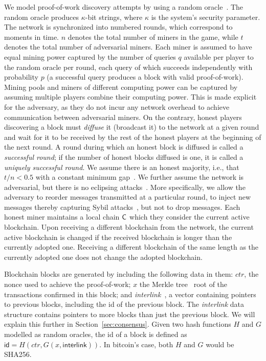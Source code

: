 We model proof-of-work discovery attempts by using a random oracle~\cite{ro}.
The random oracle produces $\kappa$-bit strings, where $\kappa$ is the system's
security parameter. The network is synchronized into numbered rounds, which
correspond to moments in time. $n$ denotes the total number of miners in the
game, while $t$ denotes the total number of adversarial miners. Each miner is
assumed to have equal mining power captured by the number of queries $q$
available per player to the random oracle per round, each query of which
succeeds independently with probability $p$ (a successful query produces a block
with valid proof-of-work). Mining pools and miners of different computing power
can be captured by assuming multiple players combine their computing power. This
is made explicit for the adversary, as they do not incur any network overhead to
achieve communication between adversarial miners. On the contrary, honest
players discovering a block must \emph{diffuse} it (broadcast it) to the
network at a given round and wait for it to be received by the rest of the
honest players at the beginning of the next round. A round during which an
honest block is diffused is called a \emph{successful round}; if the number of
honest blocks diffused is one, it is called a \emph{uniquely successful round}.
We assume there is an honest majority, i.e., that $t / n < 0.5$ with a constant
minimum gap~\cite{backbone}. We further assume the network is adversarial, but
there is no eclipsing attacks~\cite{eclipse}. More specifically, we
allow the adversary to reorder messages transmitted at a particular round, to
inject new messages thereby capturing Sybil attacks~\cite{sybil}, but not to
drop messages. Each honest miner maintains a local chain $\mathsf{C}$ which they
consider the current active blockchain. Upon receiving a different blockchain
from the network, the current active blockchain is changed if the received
blockchain is longer than the currently adopted one. Receiving a different
blockchain of the same length as the currently adopted one does not change the
adopted blockchain.

Blockchain blocks are generated by including the following data in them: $ctr$,
the nonce used to achieve the proof-of-work; $x$ the Merkle tree~\cite{merkle}
root of the transactions confirmed in this block; and
\emph{interlink}~\cite{popow}, a vector containing pointers to previous blocks,
including the id of the previous block. The \emph{interlink} data structure
contains pointers to more blocks than just the previous block. We will explain
this further in Section~\ref{sec:consensus}. Given two hash functions $H$ and
$G$ modelled as random oracles, the id of a block is defined as $\textsf{id} =
H(ctr, G(x, \textsf{interlink}))$. In bitcoin's case, both $H$ and $G$ would be
SHA256.

